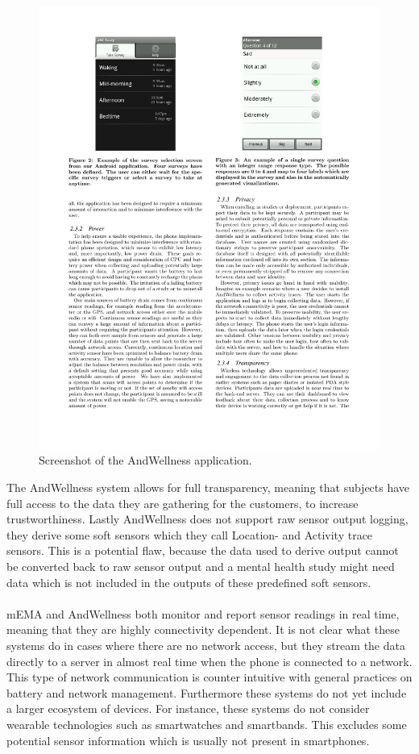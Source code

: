 \begin{figure}[!htbp]
	\centering
	\includegraphics[height=0.5\textwidth]{graphic/existing_solutions/and_wellness.pdf}
	\caption[]{Screenshot of the AndWellness application\footnotemark.}
	\label{fig:andwellness_screenshot}
\end{figure}
\FloatBarrier
{}

The AndWellness system allows for full transparency, meaning that subjects have full access to the data they are gathering for the customers, to increase trustworthiness. Lastly AndWellness does not support raw sensor output logging, they derive some soft sensors which they call Location- and Activity trace sensors. This is a potential flaw, because the data used to derive output cannot be converted back to raw sensor output and a mental health study might need data which is not included in the outputs of these predefined soft sensors.
\\\\
mEMA and AndWellness both monitor and report sensor readings in real time, meaning that they are highly connectivity dependent. It is not clear what these systems do in cases where there are no network access, but they stream the data directly to a server in almost real time when the phone is connected to a network. This type of network communication is counter intuitive with general practices on battery and network management. Furthermore these systems do not yet include a larger ecosystem of devices. For instance, these systems do not consider wearable technologies such as smartwatches and smartbands. This excludes some potential sensor information which is usually not present in smartphones.

